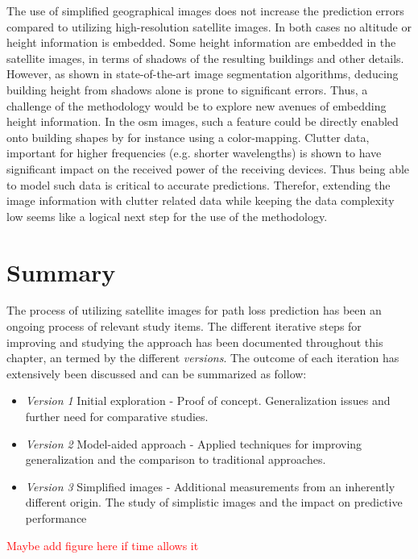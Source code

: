The use of simplified geographical images does not increase the prediction errors compared to utilizing high-resolution satellite images. In both cases no altitude or height information is embedded. Some height information are embedded in the satellite images, in terms of shadows of the resulting buildings and other details. However, as shown in state-of-the-art image segmentation algorithms, deducing building height from shadows alone is prone to significant errors. Thus, a challenge of the methodology would be to explore new avenues of embedding height information. In the \gls{osm} images, such a feature could be directly enabled onto building shapes by for instance using a color-mapping. Clutter data, important for higher frequencies (e.g. shorter wavelengths) is shown to have significant impact on the received power of the receiving devices. Thus being able to model such data is critical to accurate predictions. Therefor, extending the image information with clutter related data while keeping the data complexity low seems like a logical next step for the use of the methodology.


\section{Summary}\label{sec:satellite_image_discussion}
The process of utilizing satellite images for path loss prediction has been an ongoing process of relevant study items. The different iterative steps for improving and studying the approach has been documented throughout this chapter, an termed by the different \emph{versions}. The outcome of each iteration has extensively been discussed and can be summarized as follow:
\begin{itemize}
    \item \emph{Version 1} Initial exploration - Proof of concept. Generalization issues and further need for comparative studies.
    \item \emph{Version 2} Model-aided approach - Applied techniques for improving generalization and the comparison to traditional approaches.
    \item \emph{Version 3} Simplified images - Additional measurements from an inherently different origin. The study of simplistic images and the impact on predictive performance
\end{itemize}

\textcolor{red}{Maybe add figure here if time allows it}


